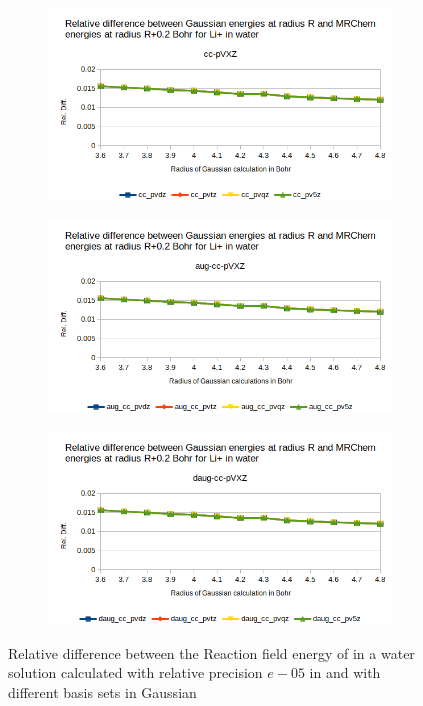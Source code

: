 \documentclass[../master_thesis.tex]{subfiles}
\begin{document}
\begin{figure}[h!]
  \centering
  \begin{subfigure}[b]{0.75\linewidth}
    \includegraphics[width=\linewidth]{img/lipreldiff02.png}
  \end{subfigure}
  \begin{subfigure}[b]{0.75\linewidth}
    \includegraphics[width=\linewidth]{img/lipaugreldiff02.png}
  \end{subfigure}
  \begin{subfigure}[b]{0.75\linewidth}
    \includegraphics[width=\linewidth]{img/lipdaugreldiff02.png}
  \end{subfigure}
  \caption{Relative difference between the Reaction field energy of  in a water solution calculated with relative precision $e-05$ in \mrchem
  and with different basis sets in Gaussian}
  \label{fig:lipreldiff02}
\end{figure}
\end{document}
